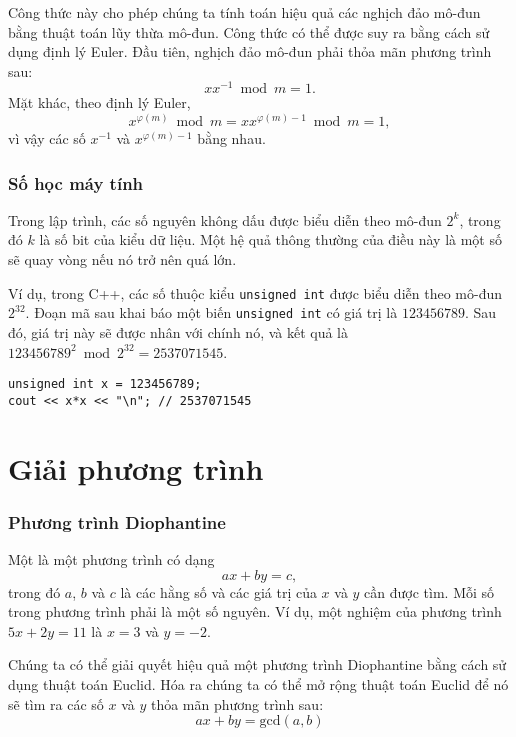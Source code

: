 Công thức này cho phép chúng ta tính toán hiệu quả
các nghịch đảo mô-đun bằng thuật toán lũy thừa mô-đun.
Công thức có thể được suy ra bằng cách sử dụng định lý Euler.
Đầu tiên, nghịch đảo mô-đun phải thỏa mãn phương trình sau:
\[
x x^{-1} \bmod m = 1.
\]
Mặt khác, theo định lý Euler,
\[
x^{\varphi(m)} \bmod m =  xx^{\varphi(m)-1} \bmod m = 1,
\]
vì vậy các số $x^{-1}$ và $x^{\varphi(m)-1}$ bằng nhau.

\subsubsection{Số học máy tính}

Trong lập trình, các số nguyên không dấu được biểu diễn theo mô-đun $2^k$,
trong đó $k$ là số bit của kiểu dữ liệu.
Một hệ quả thông thường của điều này là một số sẽ quay vòng
nếu nó trở nên quá lớn.

Ví dụ, trong C++, các số thuộc kiểu \texttt{unsigned int}
được biểu diễn theo mô-đun $2^{32}$.
Đoạn mã sau khai báo một biến \texttt{unsigned int}
có giá trị là $123456789$.
Sau đó, giá trị này sẽ được nhân với chính nó,
và kết quả là
$123456789^2 \bmod 2^{32} = 2537071545$.

\begin{lstlisting}
unsigned int x = 123456789;
cout << x*x << "\n"; // 2537071545
\end{lstlisting}

\section{Giải phương trình}

\subsubsection*{Phương trình Diophantine}


Một 
là một phương trình có dạng
\[ ax + by = c, \]
trong đó $a$, $b$ và $c$ là các hằng số
và các giá trị của $x$ và $y$ cần được tìm.
Mỗi số trong phương trình phải là một số nguyên.
Ví dụ, một nghiệm của phương trình
$5x+2y=11$ là $x=3$ và $y=-2$.


Chúng ta có thể giải quyết hiệu quả một phương trình Diophantine
bằng cách sử dụng thuật toán Euclid.
Hóa ra chúng ta có thể mở rộng thuật toán Euclid
để nó sẽ tìm ra các số $x$ và $y$
thỏa mãn phương trình sau:
\[
ax + by = \textrm{gcd}(a,b)
\]

